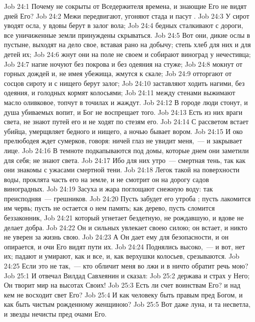\vs Job 24:1 Почему не сокрыты от Вседержителя времена, и знающие Его не видят дней Его?
\vs Job 24:2 Межи передвигают, угоняют стада и пасут .
\vs Job 24:3 У сирот уводят осла, у вдовы берут в залог вола;
\vs Job 24:4 бедных сталкивают с дороги, все уничиженные земли принуждены скрываться.
\vs Job 24:5 Вот они,  дикие ослы в пустыне, выходят на дело свое, вставая рано на добычу; степь  хлеб для них и для детей их;
\vs Job 24:6 жнут они на поле не своем и собирают виноград у нечестивца;
\vs Job 24:7 нагие ночуют без покрова и без одеяния на стуже;
\vs Job 24:8 мокнут от горных дождей и, не имея убежища, жмутся к скале;
\vs Job 24:9 отторгают от сосцов сироту и с нищего берут залог;
\vs Job 24:10 заставляют ходить нагими, без одеяния, и голодных кормят колосьями;
\vs Job 24:11 между стенами выжимают масло оливковое, топчут в точилах и жаждут.
\vs Job 24:12 В городе люди стонут, и душа убиваемых вопит, и Бог не воспрещает того.
\vs Job 24:13 Есть из них враги света, не знают путей его и не ходят по стезям его.
\vs Job 24:14 С рассветом встает убийца, умерщвляет бедного и нищего, а ночью бывает вором.
\vs Job 24:15 И око прелюбодея ждет сумерков, говоря: ничей глаз не увидит меня,~--- и закрывает лице.
\vs Job 24:16 В темноте подкапываются под домы, которые днем они заметили для себя; не знают света.
\vs Job 24:17 Ибо для них утро~--- смертная тень, так как они знакомы с ужасами смертной тени.
\vs Job 24:18 Легок такой на поверхности воды, проклята часть его на земле, и не смотрит он на дорогу садов виноградных.
\vs Job 24:19 Засуха и жара поглощают снежную воду: так преисподняя~--- грешников.
\vs Job 24:20 Пусть забудет его утроба ; пусть лакомится им червь; пусть не остается о нем память; как дерево, пусть сломится беззаконник,
\vs Job 24:21 который угнетает бездетную, не рождавшую, и вдове не делает добра.
\vs Job 24:22 Он и сильных увлекает своею силою; он встает, и никто не уверен за жизнь свою.
\vs Job 24:23 А Он дает ему  для безопасности, и он  опирается, и очи Его видят пути их.
\vs Job 24:24 Поднялись высоко,~--- и вот, нет их; падают и умирают, как и все, и, как верхушки колосьев, срезываются.
\vs Job 24:25 Если это не так,~--- кто обличит меня во лжи и в ничто обратит речь мою?
\vs Job 25:1 И отвечал Вилдад Савхеянин и сказал:
\vs Job 25:2 держава и страх у Него; Он творит мир на высотах Своих!
\vs Job 25:3 Есть ли счет воинствам Его? и над кем не восходит свет Его?
\vs Job 25:4 И как человеку быть правым пред Богом, и как быть чистым рожденному женщиною?
\vs Job 25:5 Вот даже луна, и та несветла, и звезды нечисты пред очами Его.
